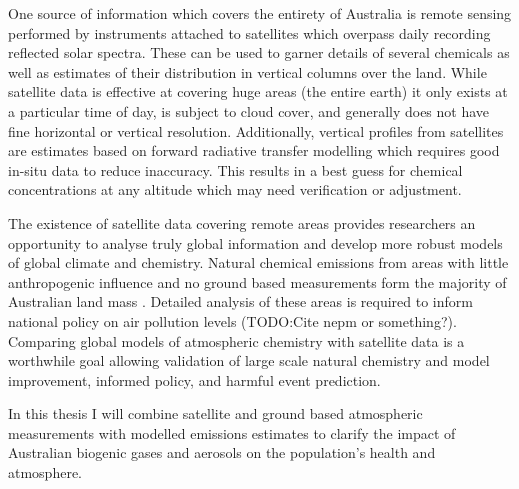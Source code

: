 One source of information which covers the entirety of Australia is remote sensing performed by instruments attached to satellites which overpass daily recording reflected solar spectra.
These can be used to garner details of several chemicals as well as estimates of their distribution in vertical columns over the land.
While satellite data is effective at covering huge areas (the entire earth) it only exists at a particular time of day, is subject to cloud cover, and generally does not have fine horizontal or vertical resolution.
Additionally, vertical profiles from satellites are estimates based on forward radiative transfer modelling which requires good in-situ data to reduce inaccuracy.
This results in a best guess for chemical concentrations at any altitude which may need verification or adjustment.

The existence of satellite data covering remote areas provides researchers an opportunity to analyse truly global information and develop more robust models of global climate and chemistry.
Natural chemical emissions from areas with little anthropogenic influence and no ground based measurements form the majority of Australian land mass \cite{VanDerA_2008}.
Detailed analysis of these areas is required to inform national policy on air pollution levels (TODO:Cite nepm or something?).   
Comparing global models of atmospheric chemistry with satellite data is a worthwhile goal allowing validation of large scale natural chemistry and model improvement, informed policy, and harmful event prediction.

In this thesis I will combine satellite and ground based atmospheric measurements with modelled emissions estimates to clarify the impact of Australian biogenic gases and aerosols on the population's health and atmosphere.
